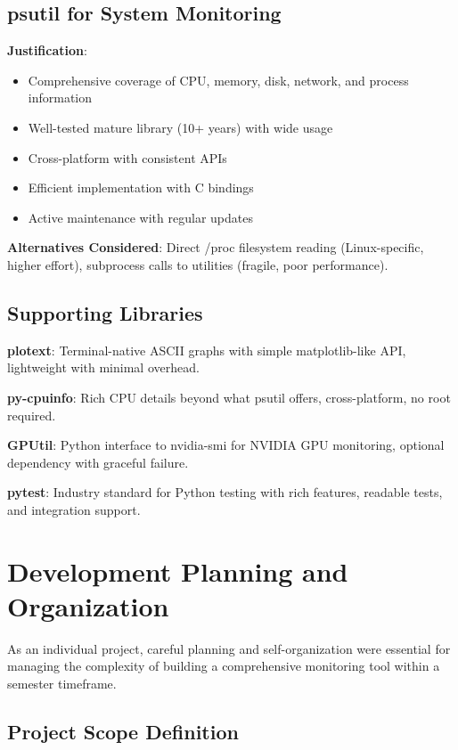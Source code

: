 \documentclass[12pt,a4paper,oneside]{report}
\begin{document}
\subsection{psutil for System Monitoring}

\textbf{Justification}:
\begin{itemize}
    \item Comprehensive coverage of CPU, memory, disk, network, and process information
    \item Well-tested mature library (10+ years) with wide usage
    \item Cross-platform with consistent APIs
    \item Efficient implementation with C bindings
    \item Active maintenance with regular updates
\end{itemize}

\textbf{Alternatives Considered}: Direct /proc filesystem reading (Linux-specific, higher effort), subprocess calls to utilities (fragile, poor performance).

\subsection{Supporting Libraries}

\textbf{plotext}: Terminal-native ASCII graphs with simple matplotlib-like API, lightweight with minimal overhead.

\textbf{py-cpuinfo}: Rich CPU details beyond what psutil offers, cross-platform, no root required.

\textbf{GPUtil}: Python interface to nvidia-smi for NVIDIA GPU monitoring, optional dependency with graceful failure.

\textbf{pytest}: Industry standard for Python testing with rich features, readable tests, and integration support.

\section{Development Planning and Organization}
\label{sec:development-planning}

As an individual project, careful planning and self-organization were essential for managing the complexity of building a comprehensive monitoring tool within a semester timeframe.

\subsection{Project Scope Definition}
\end{document}
